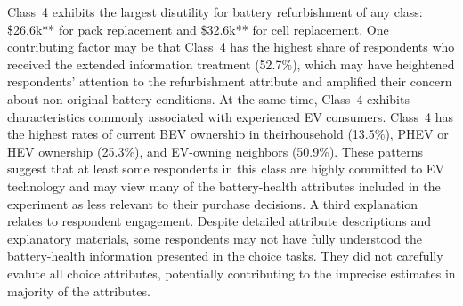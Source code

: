 \documentclass[a4paper,fleqn]{cas-sc}   %
\begin{document}
Class~4 exhibits the largest disutility for battery refurbishment of any class: \$26.6k** for pack replacement and \$32.6k** for cell replacement. One contributing factor may be that Class~4 has the highest share of respondents who received the extended information treatment (52.7\%), which may have heightened respondents' attention to the refurbishment attribute and amplified their concern about non-original battery conditions. At the same time, Class~4 exhibits characteristics commonly associated with experienced EV consumers. Class~4 has the highest rates of current BEV ownership in theirhousehold (13.5\%), PHEV or HEV ownership (25.3\%), and EV-owning neighbors (50.9\%). These patterns suggest that at least some respondents in this class are highly committed to EV technology and may view many of the battery-health attributes included in the experiment as less relevant to their purchase decisions. A third explanation relates to respondent engagement. Despite detailed attribute descriptions and explanatory materials, some respondents may not have fully understood the battery-health information presented in the choice tasks. They did not carefully evalute all choice attributes, potentially contributing to the imprecise estimates in majority of the attributes.
\end{document}

